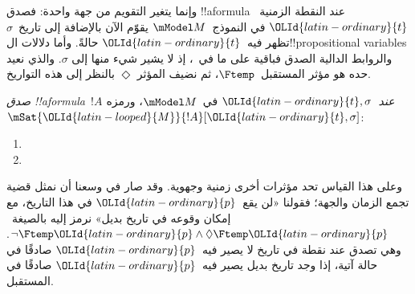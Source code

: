 \documentclass[../../../include/open-logic-section]{subfiles}
\begin{document}
وإنما يتغير التقويم من جهة واحدة: فصدق !!a{formula} عند النقطة الزمنية~$\OLId{latin-ordinary}{t}$
في النموذج~$\mModel M$ يقوّم الآن بالإضافة إلى تاريخ~$\sigma$ تظهر فيه~$\OLId{latin-ordinary}{t}$
حالةً. وأما دلالات ال!!{propositional variable}s والروابط الدالية الصدق
فباقية على ما في~، إذ لا يشير شيء منها إلى
$\sigma$. والذي نعيد حده هو مؤثر المستقبل~$\Ftemp$، ثم نضيف المؤثر
$\Diamond$ بالنظر إلى هذه التواريخ.

\begin{defn}
  \emph{صدق !!a{formula}~$!A$ عند~$\OLId{latin-ordinary}{t},\sigma$} في~$\mModel M$، ورمزه
  $\mSat{\OLId{latin-looped}{M}}{!A}[\OLId{latin-ordinary}{t},\sigma]$:
  \begin{enumerate}
  \item{} 
  \item{} 
  \end{enumerate}
\end{defn}

وعلى هذا القياس تحد مؤثرات أخرى زمنية وجهوية. وقد صار في وسعنا أن نمثل
قضية تجمع الزمان والجهة؛ فقولنا «لن يقع~$\OLId{latin-ordinary}{p}$ في هذا التاريخ، مع إمكان وقوعه
في تاريخ بديل» نرمز إليه بالصيغة~$\lnot \Ftemp \OLId{latin-ordinary}{p} \land \Diamond \Ftemp \OLId{latin-ordinary}{p}$. وهي تصدق عند
نقطة في تاريخ لا يصير فيه~$\OLId{latin-ordinary}{p}$ صادقًا في حالة آتية، إذا وجد تاريخ بديل
يصير فيه~$\OLId{latin-ordinary}{p}$ صادقًا في المستقبل.
\end{document}
